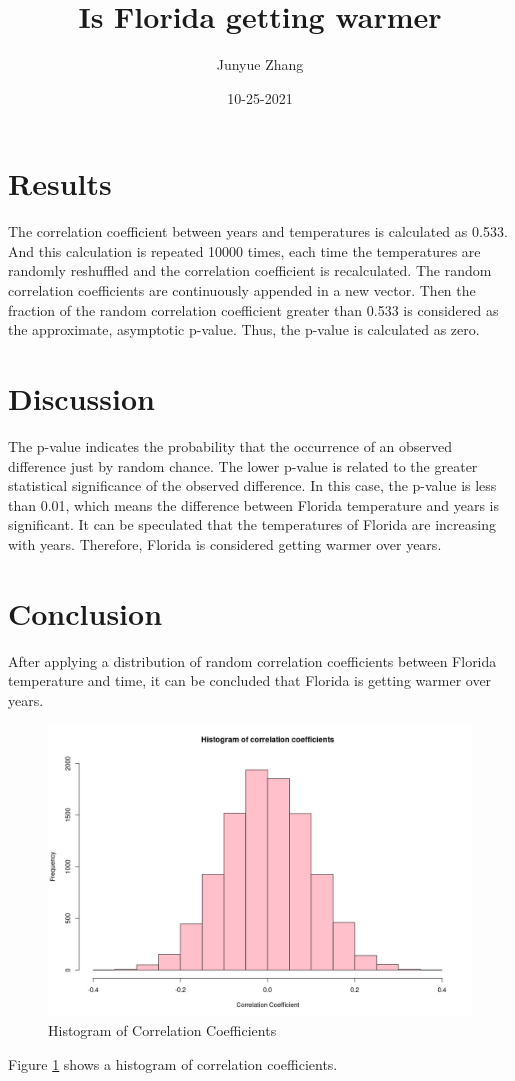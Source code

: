 \documentclass[10pt, a4paper]{article}
\title{Is Florida getting warmer}
\author{Junyue Zhang}
\date{10-25-2021}
\begin{document}
  \maketitle
  
  \section{Results}
    The correlation coefficient between years and temperatures is calculated as 0.533. And this calculation is repeated 10000 times, each time the temperatures are randomly reshuffled and the correlation coefficient is recalculated. The random correlation coefficients are continuously appended in a new vector. Then the fraction of the random correlation coefficient greater than 0.533 is considered as the approximate, asymptotic p-value. 
    Thus, the p-value is calculated as zero.  
   
  \section{Discussion}
    The p-value indicates the probability that the occurrence of an observed difference just by random chance. The lower p-value is related to the greater statistical significance of the observed difference.
    In this case, the p-value is less than 0.01, which means the difference between Florida temperature and years is significant.
    It can be speculated that the temperatures of Florida are increasing with years.  
    Therefore, Florida is considered getting warmer over years.

  \section{Conclusion}
    After applying a distribution of random correlation coefficients between Florida temperature and time, it can be concluded that Florida is getting warmer over years.

\begin{figure}[h]
  \centering
  \includegraphics[scale = 0.3]{../data/histogram_of_rcc.png}
  \caption{Histogram of Correlation Coefficients}
  \label{figure1}
\end{figure}
Figure \ref{figure1} shows a histogram of correlation coefficients.
\end{document}
